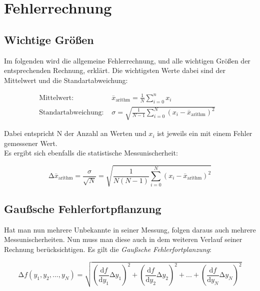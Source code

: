 \section{Fehlerrechnung}
\label{sec:Fehlerrechnung}

\subsection{Wichtige Größen}

Im folgenden wird die allgemeine Fehlerrechnung, und alle wichtigen Größen der entsprechenden Rechnung, erklärt.
Die wichtigsten Werte dabei sind der Mittelwert und die Standartabweichung:

\begin{align}
    \text{Mittelwert:} & \stackrel{_{-}}{x}_{\text{arithm}}  = \frac{1}{N} \sum_{i=0}^{n} x_i & \\
    \text{Standartabweichung: } & \sigma  = \sqrt{\frac{1}{N - 1 } \sum_{i=0}^{N} (x_i -  \stackrel{_{-}}{x}_{\text{arithm}})^2}
\end{align}

Dabei entspricht N der Anzahl an Werten und $x_i$ ist jeweils ein mit einem Fehler gemessener Wert.\\
Es ergibt sich ebenfalls die statistische Messunischerheit:

\begin{equation}
    \increment \stackrel{_{-}}{x}_{\text{arithm}} = \frac{\sigma}{\sqrt{N}} = 
    \sqrt{\frac{1}{N(N - 1)} \sum_{i=0}^{N} (x_i -  \stackrel{_{-}}{x}_{\text{arithm}})^2}
\end{equation}

\subsection{Gaußsche Fehlerfortpflanzung}

Hat man nun mehrere Unbekannte in seiner Messung, folgen daraus auch mehrere Messunischerheiten.
Nun muss man diese auch in dem weiteren Verlauf seiner Rechnung berücksichtigen.
Es gilt die \textit{Gaußsche Fehlerfortplanzung}:

\begin{equation}
    \increment f(y_1 ,y_2 ,...,y_N ) = \sqrt{\left(\frac{\text{d} f}{\text{d} y_{1}} \increment y_{1}\right)^2
    + \left(\frac{\text{d} f}{\text{d} y_{2}} \increment y_{2}\right)^2 + ... + 
    \left(\frac{\text{d} f}{\text{d} y_{N}} \increment y_{N}\right)^2
    }
\end{equation}